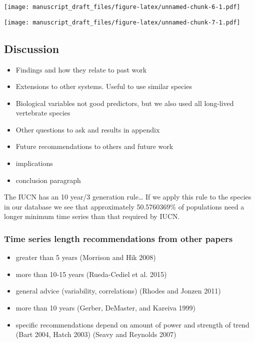 \documentclass[11pt,]{article}
\providecommand{\tightlist}{%
  \setlength{\itemsep}{0pt}\setlength{\parskip}{0pt}}
\begin{document}
\texttt{[image: manuscript\_draft\_files/figure-latex/unnamed-chunk-6-1.pdf]}

\texttt{[image: manuscript\_draft\_files/figure-latex/unnamed-chunk-7-1.pdf]}

\subsection{Discussion}\label{discussion}

\begin{itemize}
\tightlist
\item
  Findings and how they relate to past work
\item
  Extensions to other systems. Useful to use similar species
\item
  Biological variables not good predictors, but we also used all
  long-lived vertebrate species
\item
  Other questions to ask and results in appendix
\item
  Future recommendations to others and future work
\item
  implications
\item
  conclusion paragraph
\end{itemize}

The IUCN has an 10 year/3 generation rule\ldots{} If we apply this rule
to the species in our database we see that approximately 50.5760369\% of
populations need a longer minimum time series than that required by
IUCN.

\subsubsection{Time series length recommendations from other
papers}\label{time-series-length-recommendations-from-other-papers}

\begin{itemize}
\tightlist
\item
  greater than 5 years (Morrison and Hik 2008)
\item
  more than 10-15 years (Rueda-Cediel et al. 2015)
\item
  general advice (variability, correlations) (Rhodes and Jonzen 2011)
\item
  more than 10 years (Gerber, DeMaster, and Kareiva 1999)
\item
  specific recommendations depend on amount of power and strength of
  trend (Bart 2004, Hatch 2003) (Seavy and Reynolds 2007)
\end{itemize}
\end{document}
